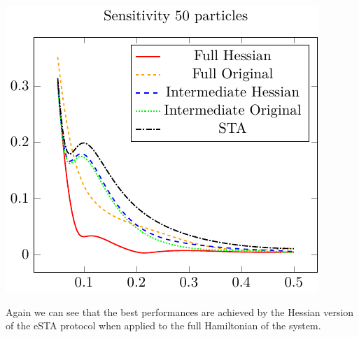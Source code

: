 \begin{center}
 \includegraphics{./gfx/sensitivity_np50_nlambda5.pdf}
\end{center}



Again we can see that the best performances are achieved by the Hessian version of the eSTA protocol when applied to the full Hamiltonian of the system.

